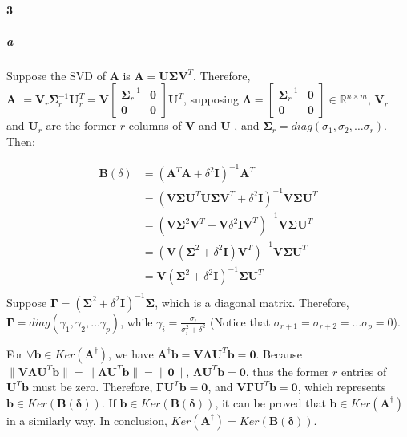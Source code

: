 \documentclass[22pt]{article}
\begin{document}
	\paragraph{3}
	 \subparagraph{a} Suppose the SVD of $\mathbf{A}$ is $\mathbf{A} = \mathbf{U \Sigma V}^T$. Therefore, $\mathbf{A}^{\dagger} = \mathbf{V}_r\mathbf{\Sigma}_r^{-1}\mathbf{U}^T_r =\mathbf{V}\left[\begin{array}{cc} \mathbf{\Sigma}_r^{-1} & \mathbf{0}\\ \mathbf{0} & \mathbf{0} \end{array}\right] \mathbf{U}^T $, supposing $\mathbf{\Lambda} = \left[\begin{array}{cc} \mathbf{\Sigma}_r^{-1} & \mathbf{0}\\ \mathbf{0} & \mathbf{0} \end{array}\right] \in \mathbb{R}^{n\times m}$, $\mathbf{V}_r$ and $\mathbf{U}_r$ are the former $r$ columns of $\mathbf{V}$ and $\mathbf{U}$ , and $\mathbf{\Sigma}_r = diag(\sigma_1, \sigma_2, \dots \sigma_r)$. Then:

	 \begin{align}
	 	\mathbf{B}(\delta) & = (\mathbf{A}^T\mathbf{A}+\delta^2\mathbf{I})^{-1}\mathbf{A}^T\\
	 	& = (\mathbf{V \Sigma U}^T\mathbf{U \Sigma V}^T + \delta^2\mathbf{I})^{-1}\mathbf{V \Sigma U}^T\\
	 	& = (\mathbf{V \Sigma}^2 \mathbf{V}^T + \mathbf{V} \delta^2\mathbf{IV}^T)^{-1}\mathbf{V \Sigma U}^T\\
	 	& = (\mathbf{V}(\mathbf{\Sigma}^2+\delta^2\mathbf{I})\mathbf{V}^T)^{-1}\mathbf{V \Sigma U}^T\\
	 	& = \mathbf{V}(\mathbf{\Sigma}^2+\delta^2\mathbf{I})^{-1}\mathbf{\Sigma U}^T\\
	 \end{align}
		 Suppose $\mathbf{\Gamma} =(\mathbf{\Sigma}^2+\delta^2\mathbf{I})^{-1}\mathbf{\Sigma}$, which is a diagonal matrix. Therefore, $\mathbf{\Gamma} = diag(\gamma_1,\gamma_2,\dots \gamma_p)$, while $\gamma_i = \frac{\sigma_i}{\sigma_i^2+\delta^2}$ (Notice that $\sigma_{r+1} = \sigma_{r+2} = \dots \sigma_p = 0$). 

		 For $\forall \mathbf{b}\in Ker(\mathbf{A}^{\dagger})$, we have $\mathbf{A}^{\dagger}\mathbf{b} = \mathbf{V \Lambda U}^T\mathbf{b} = \mathbf{0}$. Because $\|\mathbf{V \Lambda U}^T\mathbf{b}\| = \|\mathbf{\Lambda U}^T\mathbf{b}\| = \|\mathbf{0}\|$, $\mathbf{\Lambda U}^T\mathbf{b} = \mathbf{0}$, thus the former $r$ entries of $\mathbf{U}^T\mathbf{b}$ must be zero. Therefore, $\mathbf{\Gamma U}^T\mathbf{b} = \mathbf{0}$, and $\mathbf{V\Gamma U}^T\mathbf{b} = \mathbf{0}$, which represents $\mathbf{b} \in Ker(\mathbf{B(\delta)})$. If $\mathbf{b} \in  Ker(\mathbf{B(\delta)}) $, it can be proved that $\mathbf{b}\in Ker(\mathbf{A}^{\dagger})$ in a similarly way. In conclusion, $ Ker(\mathbf{A}^{\dagger}) =  Ker(\mathbf{B(\delta)})$.
\end{document}
